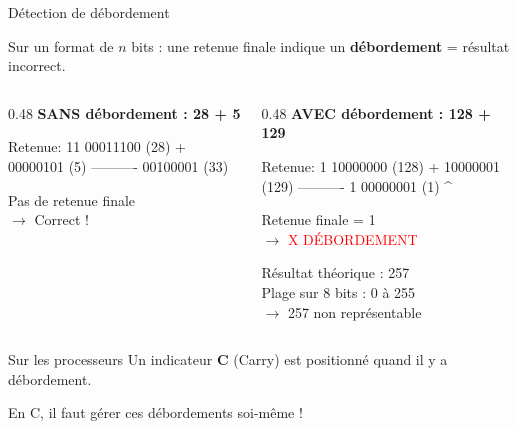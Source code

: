 \documentclass[aspectratio=1610]{beamer}
\begin{document}
\begin{frame}[fragile]{Détection de débordement}

  Sur un format de $n$ bits : une retenue finale indique un \textbf{débordement} = résultat incorrect.

  \vspace{0.5em}

  \begin{columns}
    \begin{column}{0.48\textwidth}
      \textbf{SANS débordement : 28 + 5}

      \small
      \begin{semiverbatim}
  Retenue:     11
            00011100  (28)
          + 00000101  (5)
          ----------
            00100001  (33)
      \end{semiverbatim}

      Pas de retenue finale \\
      $\rightarrow$ \textcolor{green!50!black}{ Correct !}
    \end{column}
    \begin{column}{0.48\textwidth}
      \textbf{AVEC débordement : 128 + 129}

      \small
      \begin{semiverbatim}
  Retenue: 1
            10000000  (128)
          + 10000001  (129)
          ----------
          1 00000001  (1)
            ^
      \end{semiverbatim}

      \vspace{-2em}
      Retenue finale = 1 \\
      $\rightarrow$ \textcolor{red}{X DÉBORDEMENT}

      Résultat théorique : 257 \\
      Plage sur 8 bits : 0 à 255 \\
      $\rightarrow$ 257 non représentable
    \end{column}
  \end{columns}


  \pause
  \begin{alertblock}{Sur les processeurs}
    Un indicateur \textbf{C} (Carry) est positionné quand il y a débordement.

     En C, il faut gérer ces débordements soi-même !
  \end{alertblock}

\end{frame}
\end{document}
